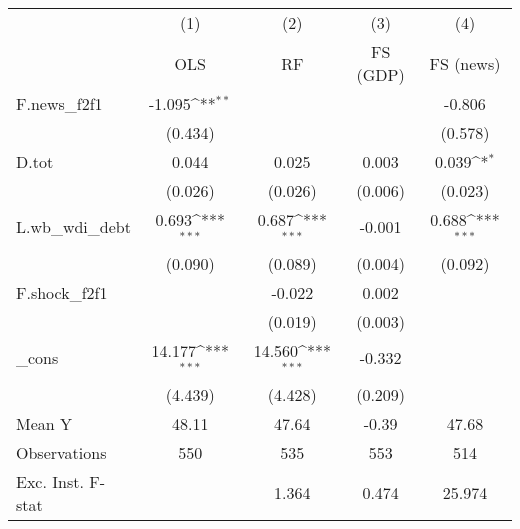 {
\def\sym#1{\ifmmode^{#1}\else\(^{#1}\)\fi}
\begin{tabular}{l*{4}{c}}
\toprule
            &\multicolumn{1}{c}{(1)}&\multicolumn{1}{c}{(2)}&\multicolumn{1}{c}{(3)}&\multicolumn{1}{c}{(4)}\\
            &\multicolumn{1}{c}{OLS}&\multicolumn{1}{c}{RF}&\multicolumn{1}{c}{FS (GDP)}&\multicolumn{1}{c}{FS (news)}\\
\midrule
F.news\_f2f1 &      -1.095\sym{**} &                     &                     &      -0.806         \\
            &     (0.434)         &                     &                     &     (0.578)         \\
\addlinespace
D.tot       &       0.044         &       0.025         &       0.003         &       0.039\sym{*}  \\
            &     (0.026)         &     (0.026)         &     (0.006)         &     (0.023)         \\
\addlinespace
L.wb\_wdi\_debt&       0.693\sym{***}&       0.687\sym{***}&      -0.001         &       0.688\sym{***}\\
            &     (0.090)         &     (0.089)         &     (0.004)         &     (0.092)         \\
\addlinespace
F.shock\_f2f1&                     &      -0.022         &       0.002         &                     \\
            &                     &     (0.019)         &     (0.003)         &                     \\
\addlinespace
\_cons      &      14.177\sym{***}&      14.560\sym{***}&      -0.332         &                     \\
            &     (4.439)         &     (4.428)         &     (0.209)         &                     \\
\midrule
Mean Y      &       48.11         &       47.64         &       -0.39         &       47.68         \\
Observations&         550         &         535         &         553         &         514         \\
Exc. Inst. F-stat&                     &       1.364         &       0.474         &      25.974         \\
\bottomrule
\end{tabular}
}
